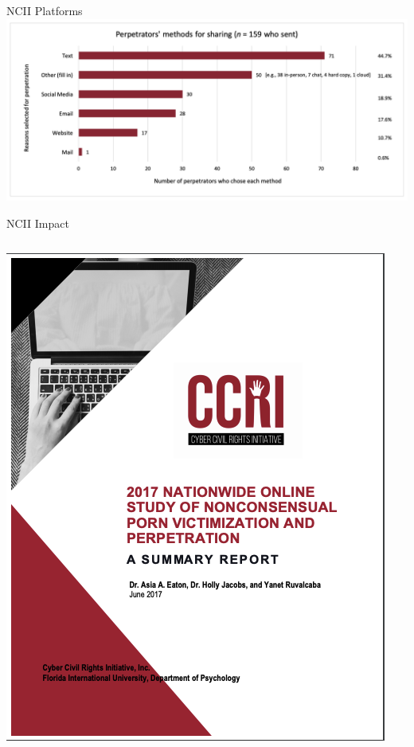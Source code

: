 \documentclass[nobackground,dvipsnames,table,aspectratio=169]{beamer}
\begin{document}
\begin{frame}{NCII Platforms}
    \includegraphics[width=\textwidth]{ncii-platforms}
\end{frame}

\begin{frame}{NCII Impact}
    \begin{columns}
            \includegraphics[width=\textwidth]{ccri-2017-report}

\end{columns}
\end{frame}
\end{document}
